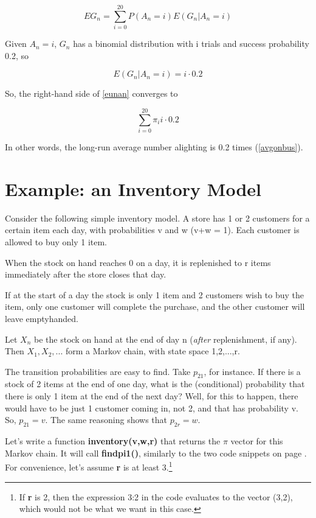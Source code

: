 \begin{equation}
\label{eunan}
EG_n = \sum_{i=0}^{20} P(A_n = i) E(G_n | A_n = i)
\end{equation}

Given $A_n = i$, $G_n$ has a binomial distribution with i trials and
success probability 0.2, so 

\begin{equation}
E(G_n | A_n = i) = i \cdot 0.2
\end{equation}

So, the right-hand side of \ref{eunan} converges to

\begin{equation}
\sum_{i=0}^{20} \pi_i i \cdot 0.2
\end{equation}

In other words, the long-run average number alighting is 0.2 times
(\ref{avgonbus}).

\section{Example: an Inventory Model}

Consider the following simple inventory model.  A store
has 1 or 2 customers for a certain item each day, with probabilities v
and w (v+w = 1).  Each customer is allowed to buy only 1 item.

When the stock on hand reaches 0 on a day, it is replenished to r
items immediately after the store closes that day.

If at the start of a day the stock is only 1 item and 2 customers wish
to buy the item, only one customer will complete the purchase, and the
other customer will leave emptyhanded.

Let $X_n$ be the stock on hand at the end of day n ({\it after}
replenishment, if any).  Then $X_1, X_2,...$ form a Markov chain, with
state space 1,2,...,r.

The transition probabilities are easy to find.  Take $p_{21}$, for
instance.  If there is a stock of 2 items at the end of one day, what
is the (conditional) probability that there is only 1 item at the end of
the next day?  Well, for this to happen, there would have to be just 1
customer coming in, not 2, and that has probability v.  So, $p_{21} =
v$.  The same reasoning shows that $p_{2r} = w$.

Let's write a function {\bf inventory(v,w,r)} that returns the
$\pi$ vector for this Markov chain.  It will call {\bf findpi1()},
similarly to the two code snippets on page \pageref{codesnippets}.
For convenience, let's assume {\bf r} is at least 3.\footnote{If {\bf
r} is 2, then the expression 3:2 in the code evaluates to the vector
(3,2), which would not be what we want in this case.}

